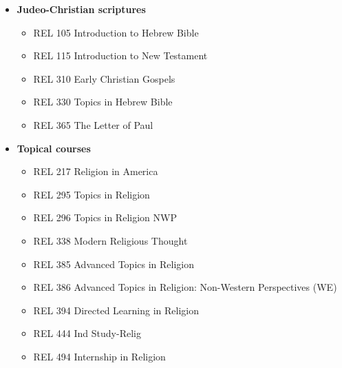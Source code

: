 \documentclass[
  letterpaper,
]{scrbook}
\providecommand{\tightlist}{%
  \setlength{\itemsep}{0pt}\setlength{\parskip}{0pt}}
\begin{document}
\begin{itemize}
\tightlist
\item
  \textbf{Judeo-Christian scriptures}

  \begin{itemize}
  \tightlist
  \item
    REL 105 Introduction to Hebrew Bible
  \item
    REL 115 Introduction to New Testament
  \item
    REL 310 Early Christian Gospels
  \item
    REL 330 Topics in Hebrew Bible
  \item
    REL 365 The Letter of Paul
  \end{itemize}
\item
  \textbf{Topical courses}

  \begin{itemize}
  \tightlist
  \item
    REL 217 Religion in America
  \item
    REL 295 Topics in Religion
  \item
    REL 296 Topics in Religion NWP
  \item
    REL 338 Modern Religious Thought
  \item
    REL 385 Advanced Topics in Religion
  \item
    REL 386 Advanced Topics in Religion: Non-Western Perspectives (WE)
  \item
    REL 394 Directed Learning in Religion
  \item
    REL 444 Ind Study-Relig
  \item
    REL 494 Internship in Religion
  \end{itemize}
\end{itemize}
\end{document}
